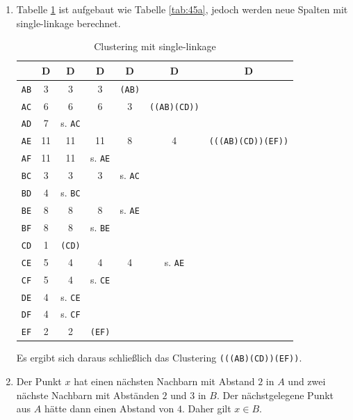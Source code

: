 \documentclass{homework}
\begin{document}
\begin{enumerate}
\begin{enumerate}
\item
Tabelle \ref{tab:45b} ist aufgebaut wie Tabelle \ref{tab:45a}, jedoch werden neue Spalten mit single-linkage berechnet.

\begin{table}
\begin{tabular}{|c|cccccc|}
\hline
 	& D & D & D & D & D & D\\\hline\hline
\texttt{AB}	& 3		& 3		& 3		& \texttt{(AB)}	& 		& \\
\texttt{AC}	& 6		& 6		& 6		& 3		& \texttt{((AB)(CD))}	& \\
\texttt{AD}	& 7		& s. \texttt{AC}	& 		& 		& 		& \\
\texttt{AE}	& 11	& 11	& 11	& 8		& 4		& \texttt{(((AB)(CD))(EF))}\\
\texttt{AF}	& 11	& 11	& s. \texttt{AE}	& 		& 		& \\
\texttt{BC}	& 3		& 3		& 3		& s. \texttt{AC}	& 		& \\
\texttt{BD}	& 4		& s. \texttt{BC}	& 		& 		& 		& \\
\texttt{BE}	& 8		& 8		& 8		& s. \texttt{AE}	& 		& \\
\texttt{BF}	& 8		& 8		& s. \texttt{BE}	& 		& 		& \\
\texttt{CD}	& 1		& \texttt{(CD)}	& 		& 		& 		& \\
\texttt{CE}	& 5		& 4		& 4		& 4		& s. \texttt{AE}	& \\
\texttt{CF}	& 5		& 4		& s. \texttt{CE}	& 		& 		& \\
\texttt{DE}	& 4		& s. \texttt{CE}	& 		& 		& 		& \\
\texttt{DF}	& 4		& s. \texttt{CF}	& 		& 		& 		& \\
\texttt{EF}	& 2		& 2		& \texttt{(EF)}	& 		& 		& \\
\hline
\end{tabular}

\caption{Clustering mit single-linkage}
\label{tab:45b}
\end{table}

Es ergibt sich daraus schließlich das Clustering \texttt{(((AB)(CD))(EF))}.

\item Der Punkt $x$ hat einen nächsten Nachbarn mit Abstand $2$ in $A$ und zwei nächste Nachbarn mit Abständen $2$ und $3$ in $B$.
Der nächstgelegene Punkt aus $A$ hätte dann einen Abstand von $4$. Daher gilt $x \in B$.
\end{enumerate}

\end{enumerate}
\end{document}

